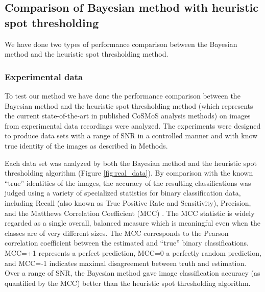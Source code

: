 \subsection{Comparison of Bayesian method with heuristic spot thresholding}

We have done two types of performance comparison between the Bayesian method and the heuristic spot thresholding method.

\subsubsection{Experimental data}

To test our method we have done the performance comparison between the Bayesian method and the heuristic spot thresholding method (which represents the current state-of-the-art in published CoSMoS analysis methods) on images from experimental data recordings were analyzed. The experiments were designed to produce data sets with a range of SNR in a controlled manner and with know true identity of the images as described in Methods.

Each data set was analyzed by both the Bayesian method and the heuristic spot thresholding algorithm (Figure \ref{fig:real_data}). By comparison with the known ``true'' identities of the images, the accuracy of the resulting classifications was judged using a variety of specialized statistics for binary classification data, including Recall (also known as True Positive Rate and Sensitivity), Precision, and the Matthews Correlation Coefficient (MCC) \citep{Fawcett2006-bq, Matthews1975-rw}. The MCC statistic is widely regarded as a single overall, balanced measure which is meaningful even when the classes are of very different sizes. The MCC corresponds to the Pearson correlation coefficient between the estimated and “true” binary classifications. MCC=+1 represents a perfect prediction, MCC=0 a perfectly random prediction, and MCC=-1 indicates maximal disagreement between truth and estimation. Over a range of SNR, the Bayesian method gave image classification accuracy (as quantified by the MCC) better than the heuristic spot thresholding algorithm.

